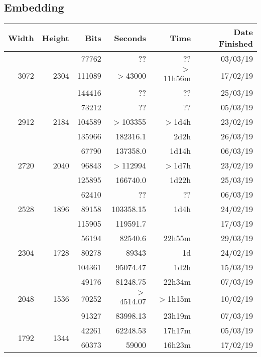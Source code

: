 \subsection{Embedding}
  \begin{center}
  \begin{tabular}{ r r r | r r r }
  Width & Height & Bits & Seconds & Time & Date Finished \\ \hline
  \multirow{3}{*}{3072} & \multirow{3}{*}{2304} & 77762 & ?? & ?? & 03/03/19 \\ %
  & & 111089 & $>$43000 & $>$11h56m & 17/02/19 \\
  & & 144416 & ?? & ?? & 25/03/19 \\ %
  \hline
  \multirow{3}{*}{2912} & \multirow{3}{*}{2184} & 73212 & ?? & ?? & 05/03/19 \\ %
  & & 104589 & $>$103355 & $>$1d4h & 23/02/19 \\
  & & 135966 & 182316.1 & 2d2h & 26/03/19 \\
  \hline
  \multirow{3}{*}{2720} & \multirow{3}{*}{2040} & 67790 & 137358.0 & 1d14h & 06/03/19 \\
  & & 96843 & $>$112994 & $>$1d7h & 23/02/19 \\
  & & 125895 & 166740.0 & 1d22h & 25/03/19 \\
  \hline
  \multirow{3}{*}{2528} & \multirow{3}{*}{1896} & 62410 & ?? & ?? & 06/03/19 \\ %
  & & 89158 & 103358.15 & 1d4h & 24/02/19 \\
  & & 115905 & 119591.7 &  & 17/03/19 \\ %
  \hline
  \multirow{3}{*}{2304} & \multirow{3}{*}{1728} & 56194 & 82540.6 & 22h55m & 29/03/19 \\
  & & 80278 & 89343 & 1d & 24/02/19 \\
  & & 104361 & 95074.47 & 1d2h & 15/03/19 \\
  \hline
  \multirow{3}{*}{2048} & \multirow{3}{*}{1536} & 49176 & 81248.75 & 22h34m & 07/03/19 \\
  & & 70252 & $>$4514.07 & $>$1h15m & 10/02/19 \\
  & & 91327 & 83998.13 & 23h19m & 07/03/19 \\
  \hline
  \multirow{3}{*}{1792} & \multirow{3}{*}{1344} & 42261 & 62248.53 & 17h17m & 05/03/19 \\
  & & 60373 & 59000 & 16h23m & 17/02/19 \\

\end{tabular}
\end{center}
